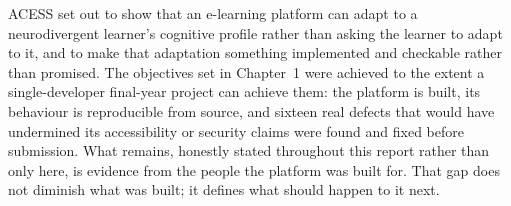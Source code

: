\documentclass[12pt, oneside]{article} %
\begin{document}
ACESS set out to show that an e-learning platform can adapt to a neurodivergent learner's cognitive profile rather than asking the learner to adapt to it, and to make that adaptation something implemented and checkable rather than promised. The objectives set in Chapter~1 were achieved to the extent a single-developer final-year project can achieve them: the platform is built, its behaviour is reproducible from source, and sixteen real defects that would have undermined its accessibility or security claims were found and fixed before submission. What remains, honestly stated throughout this report rather than only here, is evidence from the people the platform was built for. That gap does not diminish what was built; it defines what should happen to it next.


\newpage


\end{document}
